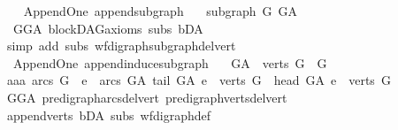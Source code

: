 \begin{isabellebody}
\endisatagproof
{\isafoldproof}%
%
\isadelimproof
\ \isanewline
%
\endisadelimproof
\isanewline
{}\isamarkupfalse%
\ {\isacharparenleft}{\kern0pt}\ Append{\isacharunderscore}{\kern0pt}One{\isacharparenright}{\kern0pt}\ append{\isacharunderscore}{\kern0pt}subgraph{\isacharcolon}{\kern0pt}\ \isanewline
\ \ {\isachardoublequoteopen}subgraph\ G\ G{\isacharunderscore}{\kern0pt}A\ {\isachardoublequoteclose}\ \isanewline
%
\isadelimproof
\ \ %
\endisadelimproof
%
\isatagproof
{}\isamarkupfalse%
\ \ GG{\isacharunderscore}{\kern0pt}A\ blockDAG{\isacharunderscore}{\kern0pt}axioms\ subs\ bD{\isacharunderscore}{\kern0pt}A\isanewline
\ \ \isamarkupfalse%
\ {\isacharparenleft}{\kern0pt}simp\ add{\isacharcolon}{\kern0pt}\ subs\ wf{\isacharunderscore}{\kern0pt}digraph{\isachardot}{\kern0pt}subgraph{\isacharunderscore}{\kern0pt}del{\isacharunderscore}{\kern0pt}vert{\isacharparenright}{\kern0pt}%
\endisatagproof
{\isafoldproof}%
%
\isadelimproof
\ \isanewline
%
\endisadelimproof
\isanewline
\isanewline
{}\isamarkupfalse%
\ {\isacharparenleft}{\kern0pt}\ Append{\isacharunderscore}{\kern0pt}One{\isacharparenright}{\kern0pt}\ append{\isacharunderscore}{\kern0pt}induce{\isacharunderscore}{\kern0pt}subgraph{\isacharcolon}{\kern0pt}\ \isanewline
\ \ {\isachardoublequoteopen}G{\isacharunderscore}{\kern0pt}A\ {\isasymrestriction}\ {\isacharparenleft}{\kern0pt}verts\ G{\isacharparenright}{\kern0pt}\ {\isacharequal}{\kern0pt}\ G{\isachardoublequoteclose}\ \ \isanewline
%
\isadelimproof
%
\endisadelimproof
%
\isatagproof
{}\isamarkupfalse%
\ {\isacharminus}{\kern0pt}\isanewline
\ \ \isamarkupfalse%
\ aaa{\isacharcolon}{\kern0pt}\ {\isachardoublequoteopen}arcs\ G\ {\isacharequal}{\kern0pt}\ {\isacharbraceleft}{\kern0pt}e\ {\isasymin}\ arcs\ G{\isacharunderscore}{\kern0pt}A{\isachardot}{\kern0pt}\ tail\ G{\isacharunderscore}{\kern0pt}A\ e\ {\isasymin}\ verts\ G\ {\isasymand}\ head\ G{\isacharunderscore}{\kern0pt}A\ e\ {\isasymin}\ verts\ G{\isacharbraceright}{\kern0pt}{\isachardoublequoteclose}\isanewline
\ \ \ \ \isamarkupfalse%
\ GG{\isacharunderscore}{\kern0pt}A\ pre{\isacharunderscore}{\kern0pt}digraph{\isachardot}{\kern0pt}arcs{\isacharunderscore}{\kern0pt}del{\isacharunderscore}{\kern0pt}vert\ pre{\isacharunderscore}{\kern0pt}digraph{\isachardot}{\kern0pt}verts{\isacharunderscore}{\kern0pt}del{\isacharunderscore}{\kern0pt}vert\isanewline
\ \ \ \ \isamarkupfalse%
\ append{\isacharunderscore}{\kern0pt}verts\ bD{\isacharunderscore}{\kern0pt}A\ subs{\isacharparenleft}{\kern0pt}{}{\isacharparenright}{\kern0pt}\ wf{\isacharunderscore}{\kern0pt}digraph{\isacharunderscore}{\kern0pt}def\isanewline

\end{isabellebody}
